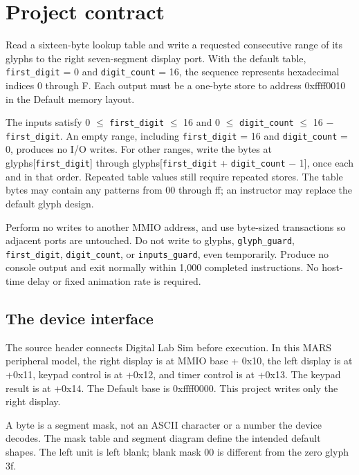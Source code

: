\section{Project contract}\label{005-seven-segment-counter-assignment-count-through-hexadecimal-glyphs-on-digital-lab}

Read a sixteen-byte lookup table and write a requested consecutive range
of its glyphs to the right seven-segment display port. With the default
table, \texttt{first\_digit} = 0 and \texttt{digit\_count} = 16, the
sequence represents hexadecimal indices 0 through F. Each output must be
a one-byte store to address 0xffff0010 in the Default memory layout.

The inputs satisfy 0 \ensuremath{\leq} \texttt{first\_digit} \ensuremath{\leq} 16 and 0 \ensuremath{\leq}
\texttt{digit\_count} \ensuremath{\leq} 16 \ensuremath{-} \texttt{first\_digit}. An empty range,
including \texttt{first\_digit} = 16 and \texttt{digit\_count} = 0,
produces no I/O writes. For other ranges, write the bytes at
glyphs{[}\texttt{first\_digit}{]} through glyphs{[}\texttt{first\_digit}
+ \texttt{digit\_count} \ensuremath{-} 1{]}, once each and in that order. Repeated
table values still require repeated stores. The table bytes may contain
any patterns from 00 through ff; an instructor may replace the default
glyph design.

Perform no writes to another MMIO address, and use byte-sized
transactions so adjacent ports are untouched. Do not write to glyphs,
\texttt{glyph\_guard}, \texttt{first\_digit}, \texttt{digit\_count}, or
\texttt{inputs\_guard}, even temporarily. Produce no console output and
exit normally within 1,000 completed instructions. No host-time delay or
fixed animation rate is required.

\subsection{The device
  interface}\label{005-seven-segment-counter-assignment-the-device-interface}

The source header connects Digital Lab Sim before execution. In this
MARS peripheral model, the right display is at MMIO base + 0x10, the
left display is at +0x11, keypad control is at +0x12, and timer control
is at +0x13. The keypad result is at +0x14. The Default base is
0xffff0000. This project writes only the right display.

A byte is a segment mask, not an ASCII character or a number the device
decodes. The mask table and segment diagram define the intended default
shapes. The left unit is left blank; blank mask 00 is different from the
zero glyph 3f.

